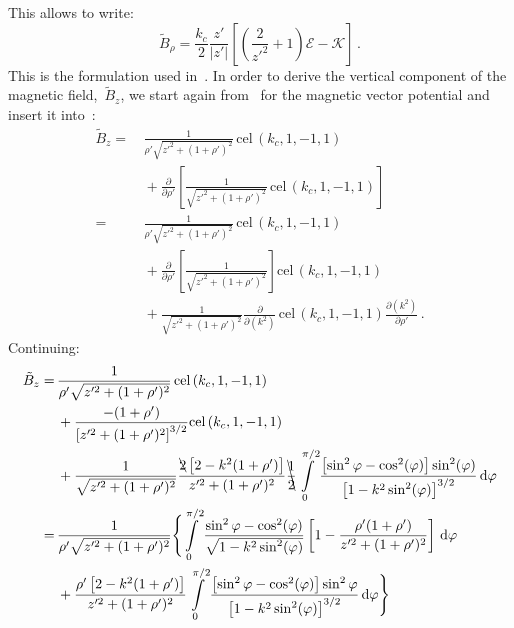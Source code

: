 This allows to write:
\begin{equation}
 \tilde{B}_\rho = \frac{k_c}{2} \frac{z'}{|z'|} \left[ \left( \frac{2}{z'^2} + 1 \right) \mathcal{E} - \mathcal{K} \right] \label{eqn:cwl_B_rho_v_derivation} \, .
\end{equation}
This is the formulation used in~.
In order to derive the vertical component of the magnetic field,~$\tilde{B}_z$,
we start again from~ for the magnetic vector potential
and insert it into~:
\begin{align}
 \tilde{B}_z
 =&\,   \frac{1}{\rho' \sqrt{z'^2 + (1 + \rho')^2}} \,\textrm{cel}\,(k_c, 1, -1, 1) \nonumber \\
 ~&\, + \frac{\partial}{\partial \rho'} \left[ \frac{1}{\sqrt{z'^2 + (1 + \rho')^2}} \,\textrm{cel}\,(k_c, 1, -1, 1) \right] \nonumber \\
 =&\,   \frac{1}{\rho' \sqrt{z'^2 + (1 + \rho')^2}} \,\textrm{cel}\,(k_c, 1, -1, 1) \nonumber \\
 ~&\, + \frac{\partial}{\partial \rho'} \left[ \frac{1}{\sqrt{z'^2 + (1 + \rho')^2}} \right] \textrm{cel}\,(k_c, 1, -1, 1) \nonumber \\
 ~&\, + \frac{1}{\sqrt{z'^2 + (1 + \rho')^2}} \frac{\partial}{\partial (k^2)} \,\textrm{cel}\,(k_c, 1, -1, 1) \frac{\partial (k^2)}{\partial \rho'} \, .
\end{align}
Continuing:
\begin{align}
 \tilde{B}_z
 =&\,   \frac{1}{\rho' \sqrt{z'^2 + (1 + \rho')^2}} \,\textrm{cel}\,(k_c, 1, -1, 1) \nonumber \\
 ~&\, + \frac{-(1 + \rho')}{\left[z'^2 + (1 + \rho')^2\right]^{3/2}} \textrm{cel}\,(k_c, 1, -1, 1) \nonumber \\
 ~&\, + \frac{1}{\sqrt{z'^2 + (1 + \rho')^2}}
          \frac{\bcancel{2} \left[2 - k^2(1+\rho')\right]}{z'^2 + (1 + \rho')^2}
          \bcancel{\frac{1}{2}} \int\limits_0^{\pi/2} \frac{\left[\sin^2{\varphi} - \cos^2(\varphi)\right]\sin^2(\varphi)}{\left[1 - k^2 \sin^2(\varphi)\right]^{3/2}} \,\mathrm{d}\varphi \nonumber \\
 =&\, \frac{1}{\rho' \sqrt{z'^2 + (1 + \rho')^2}} \Biggl\{
        \int\limits_0^{\pi/2}
          \frac{\sin^2{\varphi} - \cos^2(\varphi)}{\sqrt{1 - k^2 \sin^2(\varphi)}}
          \left[1 - \frac{\rho'(1 + \rho')}{z'^2 + (1 + \rho')^2} \right] \,\mathrm{d}\varphi \nonumber \\
 ~&\, + \frac{\rho'\left[2 - k^2(1+\rho')\right]}{z'^2 + (1 + \rho')^2}
        \int\limits_0^{\pi/2}
          \frac{\left[\sin^2{\varphi} - \cos^2(\varphi)\right]\sin^2{\varphi}}{\left[1 - k^2 \sin^2(\varphi)\right]^{3/2}} \,\mathrm{d}\varphi \Biggr\}
\end{align}
